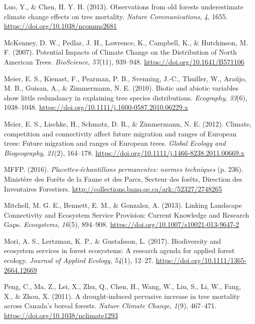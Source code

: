 \documentclass[
]{article}
\begin{document}
\leavevmode\hypertarget{ref-luo_observations_2013}{}%
Luo, Y., \& Chen, H. Y. H. (2013). Observations from old forests
underestimate climate change effects on tree mortality. \emph{Nature
Communications}, \emph{4}, 1655.
\url{https://doi.org/10.1038/ncomms2681}

\leavevmode\hypertarget{ref-mckenney_potential_2007}{}%
McKenney, D. W., Pedlar, J. H., Lawrence, K., Campbell, K., \&
Hutchinson, M. F. (2007). Potential Impacts of Climate Change on the
Distribution of North American Trees. \emph{BioScience}, \emph{57}(11),
939--948. \url{https://doi.org/10.1641/B571106}

\leavevmode\hypertarget{ref-meier_biotic_2010}{}%
Meier, E. S., Kienast, F., Pearman, P. B., Svenning, J.-C., Thuiller,
W., Araújo, M. B., Guisan, A., \& Zimmermann, N. E. (2010). Biotic and
abiotic variables show little redundancy in explaining tree species
distributions. \emph{Ecography}, \emph{33}(6), 1038--1048.
\url{https://doi.org/10.1111/j.1600-0587.2010.06229.x}

\leavevmode\hypertarget{ref-meier_climate_2012}{}%
Meier, E. S., Lischke, H., Schmatz, D. R., \& Zimmermann, N. E. (2012).
Climate, competition and connectivity affect future migration and ranges
of European trees: Future migration and ranges of European trees.
\emph{Global Ecology and Biogeography}, \emph{21}(2), 164--178.
\url{https://doi.org/10.1111/j.1466-8238.2011.00669.x}

\leavevmode\hypertarget{ref-mffp_placettes-echantillons_2016}{}%
MFFP. (2016). \emph{Placettes-échantillons permanentes: normes
techniques} (p. 236). Ministère des Forêts de la Faune et des Parcs,
Secteur des forêts, Direction des Inventaires Forestiers.
\url{http://collections.banq.qc.ca/ark:/52327/2748265}

\leavevmode\hypertarget{ref-mitchell_linking_2013}{}%
Mitchell, M. G. E., Bennett, E. M., \& Gonzalez, A. (2013). Linking
Landscape Connectivity and Ecosystem Service Provision: Current
Knowledge and Research Gaps. \emph{Ecosystems}, \emph{16}(5), 894--908.
\url{https://doi.org/10.1007/s10021-013-9647-2}

\leavevmode\hypertarget{ref-mori_biodiversity_2017}{}%
Mori, A. S., Lertzman, K. P., \& Gustafsson, L. (2017). Biodiversity and
ecosystem services in forest ecosystems: A research agenda for applied
forest ecology. \emph{Journal of Applied Ecology}, \emph{54}(1), 12--27.
\url{https://doi.org/10.1111/1365-2664.12669}

\leavevmode\hypertarget{ref-peng_drought-induced_2011}{}%
Peng, C., Ma, Z., Lei, X., Zhu, Q., Chen, H., Wang, W., Liu, S., Li, W.,
Fang, X., \& Zhou, X. (2011). A drought-induced pervasive increase in
tree mortality across Canada's boreal forests. \emph{Nature Climate
Change}, \emph{1}(9), 467--471.
\url{https://doi.org/10.1038/nclimate1293}
\end{document}

